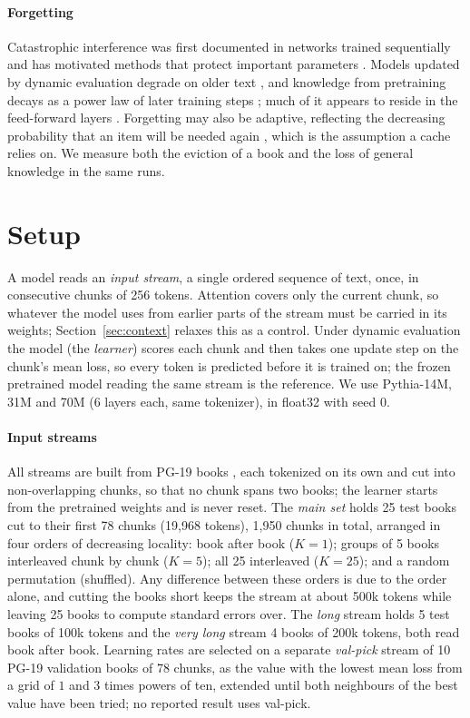 \documentclass[times,twocolumn,final,authoryear]{elsarticle}
\begin{document}
\paragraph{Forgetting}
Catastrophic interference was first documented in networks trained sequentially \citep{mccloskey1989catastrophic} and has motivated methods that protect important parameters \citep{kirkpatrick2017overcoming}.
Models updated by dynamic evaluation degrade on older text \citep{lazaridou2021mind}, and knowledge from pretraining decays as a power law of later training steps \citep{chang2024how}; much of it appears to reside in the feed-forward layers \citep{geva2021transformer,meng2022locating}.
Forgetting may also be adaptive, reflecting the decreasing probability that an item will be needed again \citep{anderson1991reflections}, which is the assumption a cache relies on.
We measure both the eviction of a book and the loss of general knowledge in the same runs.

\section{Setup}\label{sec:setup}

A model reads an \emph{input stream}, a single ordered sequence of text, once, in consecutive chunks of 256 tokens.
Attention covers only the current chunk, so whatever the model uses from earlier parts of the stream must be carried in its weights; Section~\ref{sec:context} relaxes this as a control.
Under dynamic evaluation the model (the \emph{learner}) scores each chunk and then takes one update step on the chunk's mean loss, so every token is predicted before it is trained on; the frozen pretrained model reading the same stream is the reference.
We use Pythia-14M, 31M and 70M \citep{biderman2023pythia} (6 layers each, same tokenizer), in float32 with seed 0.

\paragraph{Input streams}
All streams are built from PG-19 books \citep{rae2020compressive}, each tokenized on its own and cut into non-overlapping chunks, so that no chunk spans two books; the learner starts from the pretrained weights and is never reset.
The \emph{main set} holds 25 test books cut to their first 78 chunks (19{,}968 tokens), 1{,}950 chunks in total, arranged in four orders of decreasing locality: book after book ($K=1$); groups of 5 books interleaved chunk by chunk ($K=5$); all 25 interleaved ($K=25$); and a random permutation (shuffled).
Any difference between these orders is due to the order alone, and cutting the books short keeps the stream at about 500k tokens while leaving 25 books to compute standard errors over.
The \emph{long} stream holds 5 test books of 100k tokens and the \emph{very long} stream 4 books of 200k tokens, both read book after book.
Learning rates are selected on a separate \emph{val-pick} stream of 10 PG-19 validation books of 78 chunks, as the value with the lowest mean loss from a grid of $1$ and $3$ times powers of ten, extended until both neighbours of the best value have been tried; no reported result uses val-pick.
\end{document}
